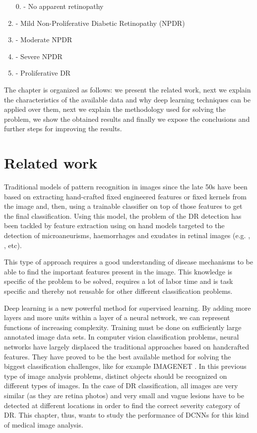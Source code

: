 \begin{enumerate}
	\item [0.]\setcounter{enumi}{0} - No apparent retinopathy
	\item - Mild Non-Proliferative Diabetic Retinopathy (NPDR)
	\item - Moderate NPDR
	\item - Severe NPDR
	\item - Proliferative DR
\end{enumerate}

The chapter is organized as follows: we present the related work, next we explain the characteristics of the available data and why deep learning techniques can be applied over them, next we explain the methodology used for solving the problem, we show the obtained results and finally we expose the conclusions and further steps for improving the results.

\section{Related work}

Traditional models of pattern recognition in images since the late 50s have been based on extracting hand-crafted fixed engineered features or fixed kernels from the image and, then, using a trainable classifier on top of those features to get the final classification. Using this model, the problem of the DR detection has been tackled by feature extraction using on hand models targeted to the detection of microaneurisms, haemorrhages and exudates in retinal images (e.g. \citep{sudha2014}, \citep{torrents15}, etc). 

This type of approach requires a good understanding of disease mechanisms to be able to find the important features present in the image. This knowledge is specific of the problem to be solved, requires a lot of labor time and is task specific and thereby not reusable for other different classification problems.

Deep learning is a new powerful method for supervised learning. By adding more layers and more units within a layer of a neural network, we can represent functions of increasing complexity. Training must be done on sufficiently large annotated image data sets. In computer vision classification problems, neural networks have largely displaced the traditional approaches based on handcrafted features. They have proved to be the best available method for solving the biggest classification challenges, like for example IMAGENET \citep{ILSVRC15}. In this previous type of image analysis problems, distinct objects should be recognized on different types of images. In the case of DR classification, all images are very similar (as they are retina photos) and very small and vague lesions have to be detected at different locations in order to find the correct severity category of DR. This chapter, thus, wants to study the performance of DCNNs for this kind of medical image analysis.

